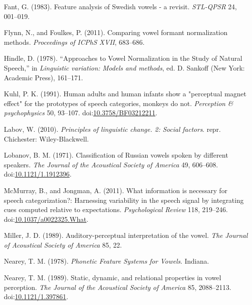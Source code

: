 \documentclass[utf8]{frontiers_suppmat} %
\newlength{\cslhangindent}
\newlength{\cslentryspacingunit} %
\newenvironment{CSLReferences}[2] %
 {%
  \setlength{\parindent}{0pt}
  \ifodd #1
  \let\oldpar\par
  \def\par{\hangindent=\cslhangindent\oldpar}
  \fi
  \setlength{\parskip}{#2\cslentryspacingunit}
 }%
 {}
\begin{document}
\begin{CSLReferences}{1}{0}
\leavevmode{}%
Fant, G. (1983). Feature analysis of {Swedish} vowels - a revisit. \emph{STL-QPSR} 24, 001--019.

\leavevmode{}%
Flynn, N., and Foulkes, P. (2011). Comparing vowel formant normalization methods. \emph{Proceedings of ICPhS XVII}, 683--686.

\leavevmode{}%
Hindle, D. (1978). {``Approaches to {Vowel Normalization} in the {Study} of {Natural Speech},''} in \emph{Linguistic variation: Models and methods}, ed. D. Sankoff ({New York}: {Academic Press}), 161--171.

\leavevmode{}%
Kuhl, P. K. (1991). Human adults and human infants show a "perceptual magnet effect" for the prototypes of speech categories, monkeys do not. \emph{Perception \& psychophysics} 50, 93--107. doi:\href{https://doi.org/10.3758/BF03212211}{10.3758/BF03212211}.

\leavevmode{}%
Labov, W. (2010). \emph{Principles of linguistic change. 2: {Social} factors}. repr. {Chichester}: {Wiley-Blackwell}.

\leavevmode{}%
Lobanov, B. M. (1971). Classification of {Russian} vowels spoken by different speakers. \emph{The Journal of the Acoustical Society of America} 49, 606--608. doi:\href{https://doi.org/10.1121/1.1912396}{10.1121/1.1912396}.

\leavevmode{}%
McMurray, B., and Jongman, A. (2011). What information is necessary for speech categorization?: {Harnessing} variability in the speech signal by integrating cues computed relative to expectations. \emph{Psychological Review} 118, 219--246. doi:\href{https://doi.org/10.1037/a0022325.What}{10.1037/a0022325.What}.

\leavevmode{}%
Miller, J. D. (1989). Auditory-perceptual interpretation of the vowel. \emph{The Journal of Acoustical Society of America} 85, 22.

\leavevmode{}%
Nearey, T. M. (1978). \emph{Phonetic {Feature Systems} for {Vowels}}. {Indiana}.

\leavevmode{}%
Nearey, T. M. (1989). Static, dynamic, and relational properties in vowel perception. \emph{The Journal of the Acoustical Society of America} 85, 2088--2113. doi:\href{https://doi.org/10.1121/1.397861}{10.1121/1.397861}.


\end{CSLReferences}
\end{document}

